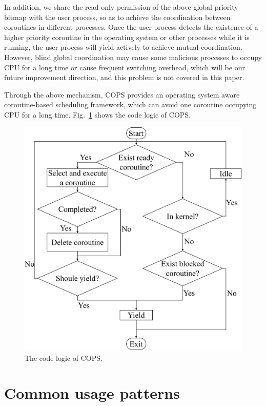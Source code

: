 \documentclass[sigconf,review,anonymous]{acmart}
\begin{document}
In addition, we share the read-only permission of the above global priority bitmap with the user process, so as to achieve the coordination between coroutines in different processes. Once the user process detects the existence of a higher priority coroutine in the operating system or other processes while it is running, the user process will yield actively to achieve mutual coordination. However, blind global coordination may cause some malicious processes to occupy CPU for a long time or cause frequent switching overhead, which will be our future improvement direction, and this problem is not covered in this paper.

Through the above mechanism, COPS provides an operating system aware coroutine-based scheduling framework, which can avoid one coroutine occupying CPU for a long time. Fig.~\ref{fig:flow} shows the code logic of COPS.

\begin{figure}[h]
  \centering
  \includegraphics[width=\linewidth]{assets/flow.pdf}
  \caption{The code logic of COPS.}
  \label{fig:flow}
\end{figure}

\section{Common usage patterns}
\label{section: Common usage patterns}
\end{document}
